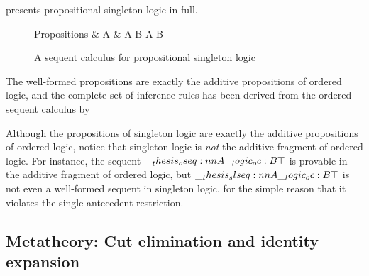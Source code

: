  presents propositional singleton logic in full.
%
\begin{figure}[t]
  \begin{syntax*}
    Propositions &
      A & \alpha \mid A \plus B \mid \zero \mid A \with B \mid \top
  \end{syntax*}
  \caption{A sequent calculus for propositional singleton logic\label{fig:singleton-logic:seq-calc}}
\end{figure}
%
The well-formed propositions are exactly the additive propositions of ordered logic, and the complete set of inference rules has been derived from the ordered sequent calculus by 

Although the propositions of singleton logic are exactly the additive propositions of ordered logic, notice that singleton logic is \emph{not} the additive fragment of ordered logic.
For instance, the sequent $\oseq{A \oc B |- \top}$ is provable in the additive fragment of ordered logic, but $\slseq{A \oc B |- \top}$ is not even a well-formed sequent in singleton logic, for the simple reason that it violates the single-antecedent restriction.

\subsection{Metatheory: Cut elimination and identity expansion}

